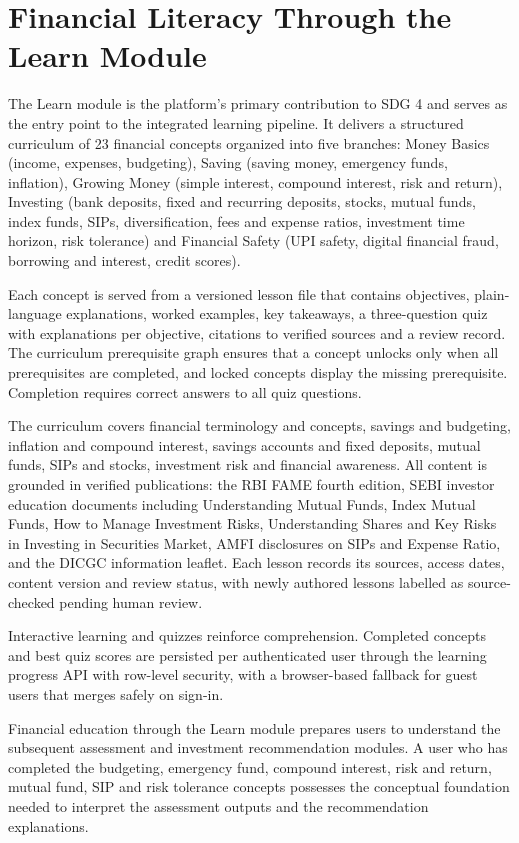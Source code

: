 \section{Financial Literacy Through the Learn Module}

The Learn module is the platform's primary contribution to SDG 4 and serves as the entry point to the integrated learning pipeline. It delivers a structured curriculum of 23 financial concepts organized into five branches: Money Basics (income, expenses, budgeting), Saving (saving money, emergency funds, inflation), Growing Money (simple interest, compound interest, risk and return), Investing (bank deposits, fixed and recurring deposits, stocks, mutual funds, index funds, SIPs, diversification, fees and expense ratios, investment time horizon, risk tolerance) and Financial Safety (UPI safety, digital financial fraud, borrowing and interest, credit scores).

Each concept is served from a versioned lesson file that contains objectives, plain-language explanations, worked examples, key takeaways, a three-question quiz with explanations per objective, citations to verified sources and a review record. The curriculum prerequisite graph ensures that a concept unlocks only when all prerequisites are completed, and locked concepts display the missing prerequisite. Completion requires correct answers to all quiz questions.

The curriculum covers financial terminology and concepts, savings and budgeting, inflation and compound interest, savings accounts and fixed deposits, mutual funds, SIPs and stocks, investment risk and financial awareness. All content is grounded in verified publications: the RBI FAME fourth edition, SEBI investor education documents including Understanding Mutual Funds, Index Mutual Funds, How to Manage Investment Risks, Understanding Shares and Key Risks in Investing in Securities Market, AMFI disclosures on SIPs and Expense Ratio, and the DICGC information leaflet. Each lesson records its sources, access dates, content version and review status, with newly authored lessons labelled as source-checked pending human review.

Interactive learning and quizzes reinforce comprehension. Completed concepts and best quiz scores are persisted per authenticated user through the learning progress API with row-level security, with a browser-based fallback for guest users that merges safely on sign-in.

Financial education through the Learn module prepares users to understand the subsequent assessment and investment recommendation modules. A user who has completed the budgeting, emergency fund, compound interest, risk and return, mutual fund, SIP and risk tolerance concepts possesses the conceptual foundation needed to interpret the assessment outputs and the recommendation explanations.
